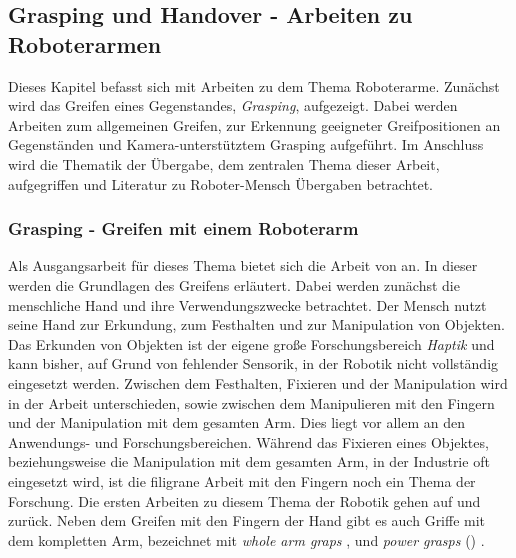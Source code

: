 \subsection{Grasping und Handover - Arbeiten zu Roboterarmen}
\label{sec:relatedwork-handover}
Dieses Kapitel befasst sich mit Arbeiten zu dem Thema Roboterarme. Zunächst wird das Greifen eines Gegenstandes, \textit{Grasping}, aufgezeigt. Dabei werden Arbeiten zum allgemeinen Greifen, zur Erkennung geeigneter Greifpositionen an Gegenständen und Kamera-unterstütztem Grasping aufgeführt. Im Anschluss wird die Thematik der Übergabe, dem zentralen Thema dieser Arbeit, aufgegriffen und Literatur zu Roboter-Mensch Übergaben betrachtet.

\subsubsection{Grasping - Greifen mit einem Roboterarm}
Als Ausgangsarbeit für dieses Thema bietet sich die Arbeit von \cite{bicchi2000robotic} an. In dieser werden die Grundlagen des Greifens erläutert. Dabei werden zunächst die menschliche Hand und ihre Verwendungszwecke betrachtet. Der Mensch nutzt seine Hand zur Erkundung, zum Festhalten und zur Manipulation von Objekten. Das Erkunden von Objekten ist der eigene große Forschungsbereich \textit{Haptik} und kann bisher, auf Grund von fehlender Sensorik, in der Robotik nicht vollständig eingesetzt werden. Zwischen dem Festhalten, Fixieren und der Manipulation wird in der Arbeit unterschieden, sowie zwischen dem Manipulieren mit den Fingern und der Manipulation mit dem gesamten Arm. Dies liegt vor allem an den Anwendungs- und Forschungsbereichen. Während das Fixieren eines Objektes, beziehungsweise die Manipulation mit dem gesamten Arm, in der Industrie oft eingesetzt wird, ist die filigrane Arbeit mit den Fingern noch ein Thema der Forschung. Die ersten Arbeiten zu diesem Thema der Robotik gehen auf \cite{asada1979studies}  und \cite{mason1985robot} zurück. Neben dem Greifen mit den Fingern der Hand gibt es auch Griffe mit dem kompletten Arm, bezeichnet mit \textit{whole arm graps} \citep{townsend1988effect}, \citep{bicchi1994problem} und \textit{power grasps} (\citep{mirza1990force}) \citep{bicchi2000robotic}. 

